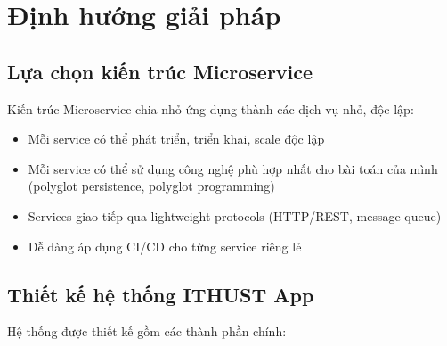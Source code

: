 \documentclass[12pt]{extreport}
\begin{document}
\section{Định hướng giải pháp}

\subsection{Lựa chọn kiến trúc Microservice}

Kiến trúc Microservice chia nhỏ ứng dụng thành các dịch vụ nhỏ, độc lập:
\begin{itemize}
    \item Mỗi service có thể phát triển, triển khai, scale độc lập
    \item Mỗi service có thể sử dụng công nghệ phù hợp nhất cho bài toán của mình (polyglot persistence, polyglot programming)
    \item Services giao tiếp qua lightweight protocols (HTTP/REST, message queue)
    \item Dễ dàng áp dụng CI/CD cho từng service riêng lẻ
\end{itemize}

\subsection{Thiết kế hệ thống ITHUST App}

Hệ thống được thiết kế gồm các thành phần chính:
\end{document}
